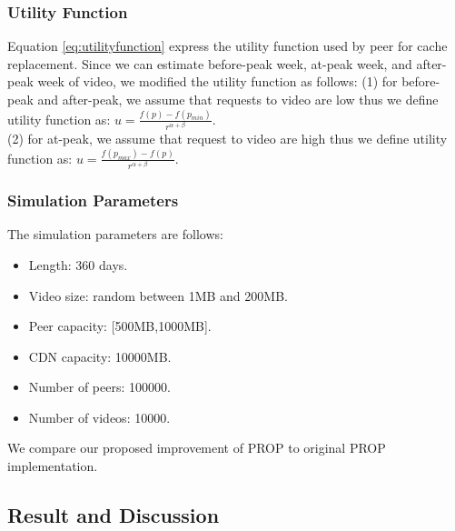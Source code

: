\documentclass[conference]{IEEEtran}
\begin{document}
\subsubsection{Utility Function}
Equation \ref{eq:utilityfunction} express the utility function used by peer for cache replacement. 
Since we can estimate before-peak week, at-peak week, and after-peak week of video, we modified the utility function as follows: (1) for before-peak and after-peak, we assume that requests to video are low thus we define utility function as:  $u = \frac{f(p)-f(p_{min})} {r^{\alpha+\beta}}$.\\
(2) for at-peak, we assume that request to video are high thus we define utility function as:
$u = \frac{f(p_{max})-f(p)}{r^{\alpha+\beta}}$.

\subsubsection{Simulation Parameters}
The simulation parameters are follows:
\begin{itemize}
\item Length: 360 days.
\item Video size: random between 1MB and 200MB.
\item Peer capacity: [500MB,1000MB].
\item CDN capacity: 10000MB.
\item Number of peers: 100000.
\item Number of videos: 10000.
\end{itemize}
We compare our proposed improvement of PROP to original PROP \cite{1613869} implementation.



\subsection{Result and Discussion}\label{resultanddiscussion}
\end{document}
